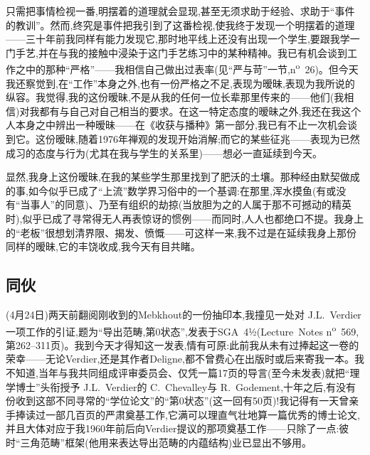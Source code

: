 只需把事情检视一番,明摆着的道理就会显现,甚至无须求助于经验、求助于“事件的教训”。然而,终究是事件把我引到了这番检视,使我终于发现一个明摆着的道理——三十\dmark{}年前我同样有能力发现它,那时地平线上还没有出现一个学生,要跟我学一门手艺,并在与我的接触中浸染于这门手艺练习中的某种精神。我已有机会谈到工作之中的那种“严格”——我相信自己做出过表率(见“严与苛”一节,n\textsuperscript{o}~26)。但今天我还察觉到,在“工作”本身之外,也有一份严格之不足,表现为暧昧,表现为我所说的纵容。我觉得,我的这份暧昧,不是从我的任何一位长辈那里传来的——他们(我相信)对我都有与自己对自己相当的要求。在这一特定态度的暧昧之外,我还在我这个人本身之中辨出一种暧昧——在《收获与播种》第一部分,我已有不止一次机会谈到它。这份暧昧,随着1976年禅观的发现开始消解;而它的某些征兆——表现为已然成习的态度与行为(尤其在我与学生的关系里)——想必一直延续到今天。

显然,我身上这份暧昧,在我的某些学生那里找到了肥沃的土壤。那种经由默契做成的事,如今似乎已成了“上流”数学界习俗中的一个基调:在那里,浑水摸鱼(有或没有“当事人”的同意)、乃至有组织的劫掠(当放胆为之的人属于那不可撼动的精英时),似乎已成了寻常得无人再表惊讶的惯例——而同时,人人也都绝口不提。我身上的“老板”很想划清界限、揭发、愤慨——可这样一来,我不过是在延续我身上那份同样的暧昧,它的丰饶收成,我今天有目共睹。

\subsection{同伙}


(4月24日)两天前翻阅刚收到的Mebkhout的一份抽印本,我撞见一处对 J.L.~Verdier一项工作的引证,题为“导出范畴,第0状态”,发表于SGA~4½(Lecture~Notes n\textsuperscript{o}~569,第262--311页)。我到今天才得知这一发表,情有可原:此前我从未有过捧起这一卷的荣幸——无论Verdier,还是其作者Deligne\dmark{},都不曾费心在出版时或后来寄我一本。我不知道,当年与我共同组成评审委员会、仅凭一篇17页的导言(至今未发表)就把“理学博士”头衔授予 J.L.~Verdier的 C.~Chevalley与 R.~Godement,十年之后,有没有份收到这部不同寻常的“学位论文”的“第0状态”(这一回有50页)!我记得有一天曾亲手捧读过一部几百页的严肃奠基工作,它满可以理直气壮地算一篇优秀的博士论文,并且大体对应于我1960年前后向Verdier提议的那项奠基工作——只除了一点:彼时“三角范畴”框架(他用来表达导出范畴的内蕴结构)业已显出不够用。

